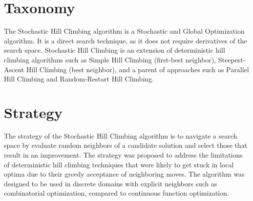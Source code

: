 \documentclass[a4paper, 11pt]{article}
\begin{document}
\section{Taxonomy}
\label{sec:taxonomy}
The Stochastic Hill Climbing algorithm is a Stochastic and Global Optimization algorithm. It is a direct search technique, as it does not require derivatives of the search space.
Stochastic Hill Climbing is an extension of deterministic hill climbing algorithms such as Simple Hill Climbing (first-best neighbor), Steepest-Ascent Hill Climbing (best neighbor), and a parent of approaches such as Parallel Hill Climbing and Random-Restart Hill Climbing.

\section{Strategy}
\label{sec:strategy}
The strategy of the Stochastic Hill Climbing algorithm is to navigate a search space by evaluate random neighbors of a candidate solution and select those that result in an improvement. The strategy was proposed to address the limitations of deterministic hill climbing techniques that were likely to get stuck in local optima due to their greedy acceptance of neighboring moves. The algorithm was designed to be used in discrete domains with explicit neighbors such as combinatorial optimization, compared to continuous function optimization. 
\end{document}
